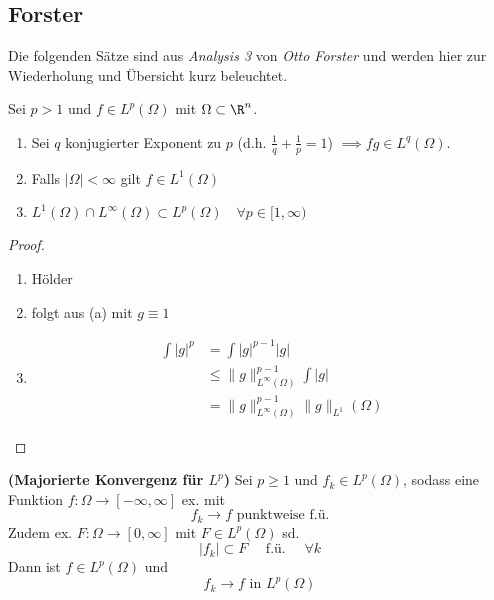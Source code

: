 

\subsection{Forster}

Die folgenden S\"atze sind aus \textit{Analysis 3} von \textit{Otto Forster} und werden hier zur Wiederholung und Übersicht kurz beleuchtet.
\enter

\begin{satz}
	Sei $p > 1$ und $f \in L^p(\Omega)$ mit $\Omega \subset \R^n$. 
	\renewcommand{\labelenumi}{(\alph{enumi})}
	\begin{enumerate}
		\item Sei $q$ konjugierter Exponent zu $p$ (d.h. $\frac{1}{q} + \frac{1}{p}=1$)
			$\implies fg \in L^q(\Omega)$.
		\item Falls $|\Omega| < \infty$ gilt $f \in L^1(\Omega)$
		\item $ L^1(\Omega) \cap L^{\infty}(\Omega) \subset L^p(\Omega) \quad \forall p\in [1,\infty) $
	\end{enumerate}
\end{satz}

\begin{proof}
	\enter
	\renewcommand{\labelenumi}{(\alph{enumi})}
	\begin{enumerate}
		\item H\"older
		\item folgt aus (a) mit $g\equiv1$
		\item
			\begin{align*}
				\int |g|^p &= \int |g|^{p-1}|g| \\
									 &\leq \|g\|^{p-1}_{L^\infty(\Omega)}\int |g| \\
									 &= \|g\|^{p-1}_{L^\infty(\Omega)}\|g\|_{L^1}(\Omega)
			\end{align*}
	\end{enumerate}

\end{proof}

\begin{satz}\textbf{(Majorierte Konvergenz für $L^p$)} \enter
	Sei $p \geq 1$ und $f_k \in L^p(\Omega)$, sodass eine Funktion $f:\Omega\to [-\infty,\infty]$ ex. mit
	\[f_k \to f\text{ punktweise f.\"u.}\]
	Zudem ex. $F: \Omega \to [0,\infty]$ mit $F \in L^p(\Omega)$ sd. 
	\[|f_k| \subset F \quad \text{ f.\"u. } \quad \forall k\]
	Dann ist $f\in L^p(\Omega)$ und 
	\[f_k \to f \text{ in }L^p(\Omega)\]
\end{satz}

